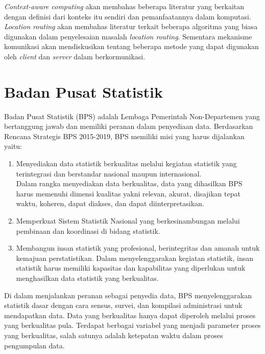 \textit{Context-aware computing} akan membahas beberapa literatur yang berkaitan dengan definisi dari konteks itu sendiri dan pemanfaatannya dalam komputasi. \textit{Location routing} akan membahas literatur terkait beberapa algoritma yang biasa digunakan dalam penyelesaian masalah \textit{location routing}. Sementara mekanisme komunikasi akan mendiskusikan tentang beberapa metode yang dapat digunakan oleh \textit{client} dan \textit{server} dalam berkormunikasi.


\section{Badan Pusat Statistik}
\label{sec:badan-pusat-statistik}
Badan Pusat Statistik (BPS) adalah Lembaga Pemerintah Non-Departemen yang bertanggung jawab dan memiliki peranan dalam penyediaan data. Berdasarkan Rencana Strategis BPS 2015-2019, BPS memiliki misi yang harus dijalankan yaitu:
\begin{enumerate}
\item Menyediakan data statistik berkualitas melalui kegiatan statistik yang terintegrasi dan berstandar nasional maupun internasional. \\
Dalam rangka menyediakan data berkualitas, data yang dihasilkan BPS harus memenuhi dimensi kualitas yakni relevan, akurat, disajikan tepat waktu, koheren, dapat diakses, dan dapat diinterpretasikan.
\item Memperkuat Sistem Statistik Nasional yang berkesinambungan melalui pembinaan dan koordinasi di bidang statistik.
\item Membangun insan statistik yang profesional, berintegritas dan amanah untuk kemajuan perstatistikan.
Dalam menyelenggarakan kegiatan statistik, insan statistik harus memiliki kapasitas dan kapabilitas yang diperlukan untuk menghasilkan data statistik yang berkualitas.
\end{enumerate}


Di dalam menjalankan peranan sebagai penyedia data, BPS menyelenggarakan statistik dasar dengan cara sensus, survei, dan kompilasi administrasi untuk mendapatkan data. Data yang berkualitas hanya dapat diperoleh melalui proses yang berkualitas pula. Terdapat berbagai variabel yang menjadi parameter proses yang berkualitas, salah satunya adalah ketepatan waktu dalam proses pengumpulan data.


